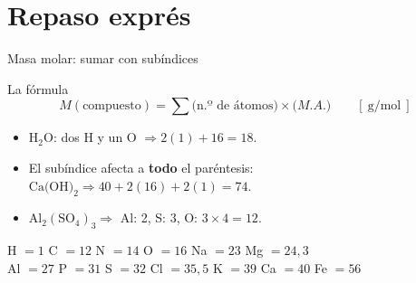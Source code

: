 \documentclass[aspectratio=169]{beamer}
\begin{document}
\begin{frame}[plain]
  \titlepage
\end{frame}

\section{Repaso exprés}

\begin{frame}{Masa molar: sumar con subíndices}
  \begin{block}{La fórmula}
    \[
      M(\text{compuesto}) = \sum \bigl(\text{n.º de átomos}\bigr)\times \bigl(M.A.\bigr)
      \qquad [\ \text{g/mol}\ ]
    \]
  \end{block}
  \vspace{2pt}
  \begin{mwpasos}
    \begin{itemize}
      \item $\text{H}_2\text{O}$: dos H y un O $\Rightarrow 2(1)+16 = 18$.
      \item El subíndice afecta a \textbf{todo} el paréntesis:
            $\text{Ca(OH)}_2 \Rightarrow 40 + 2(16) + 2(1) = 74$.
      \item $\text{Al}_2(\text{SO}_4)_3 \Rightarrow$ Al: 2, S: 3, O: $3\times4 = 12$.
    \end{itemize}
  \end{mwpasos}
  \vspace{2pt}
  \begin{mwextra}
    \centering
    \small
    H $=1$ \quad C $=12$ \quad N $=14$ \quad O $=16$ \quad Na $=23$ \quad Mg $=24{,}3$\\[2pt]
    Al $=27$ \quad P $=31$ \quad S $=32$ \quad Cl $=35{,}5$ \quad K $=39$ \quad Ca $=40$ \quad Fe $=56$
  \end{mwextra}
\end{frame}
\end{document}
